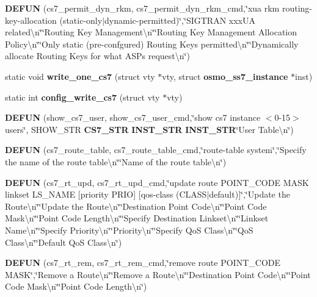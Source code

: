 \begin{DoxyCompactItemize}
\item 
{\bf D\+E\+F\+UN} (cs7\+\_\+permit\+\_\+dyn\+\_\+rkm, cs7\+\_\+permit\+\_\+dyn\+\_\+rkm\+\_\+cmd,\char`\"{}xua rkm routing-\/key-\/allocation (static-\/only$\vert$dynamic-\/permitted)\char`\"{},\char`\"{}S\+I\+G\+T\+R\+AN xxx\+UA related\textbackslash{}n\char`\"{}\char`\"{}Routing Key Management\textbackslash{}n\char`\"{}\char`\"{}Routing Key Management Allocation Policy\textbackslash{}n\char`\"{}\char`\"{}Only static (pre-\/confgured) Routing Keys permitted\textbackslash{}n\char`\"{}\char`\"{}Dynamically allocate Routing Keys for what A\+S\+Ps request\textbackslash{}n\char`\"{})
\item 
static void {\bf write\+\_\+one\+\_\+cs7} (struct vty $\ast$vty, struct {\bf osmo\+\_\+ss7\+\_\+instance} $\ast$inst)
\item 
static int {\bf config\+\_\+write\+\_\+cs7} (struct vty $\ast$vty)
\item 
{\bf D\+E\+F\+UN} (show\+\_\+cs7\+\_\+user, show\+\_\+cs7\+\_\+user\+\_\+cmd,\char`\"{}show cs7 instance $<$0-\/15$>$ users\char`\"{}, S\+H\+O\+W\+\_\+\+S\+TR {\bf C\+S7\+\_\+\+S\+TR} {\bf I\+N\+S\+T\+\_\+\+S\+TR} {\bf I\+N\+S\+T\+\_\+\+S\+TR}\char`\"{}User Table\textbackslash{}n\char`\"{})
\item 
{\bf D\+E\+F\+UN} (cs7\+\_\+route\+\_\+table, cs7\+\_\+route\+\_\+table\+\_\+cmd,\char`\"{}route-\/table system\char`\"{},\char`\"{}Specify the name of the route table\textbackslash{}n\char`\"{}\char`\"{}Name of the route table\textbackslash{}n\char`\"{})
\item 
{\bf D\+E\+F\+UN} (cs7\+\_\+rt\+\_\+upd, cs7\+\_\+rt\+\_\+upd\+\_\+cmd,\char`\"{}update route P\+O\+I\+N\+T\+\_\+\+C\+O\+DE M\+A\+SK linkset L\+S\+\_\+\+N\+A\+ME [priority P\+R\+IO] [qos-\/class (C\+L\+A\+SS$\vert$default)]\char`\"{},\char`\"{}Update the Route\textbackslash{}n\char`\"{}\char`\"{}Update the Route\textbackslash{}n\char`\"{}\char`\"{}Destination Point Code\textbackslash{}n\char`\"{}\char`\"{}Point Code Mask\textbackslash{}n\char`\"{}\char`\"{}Point Code Length\textbackslash{}n\char`\"{}\char`\"{}Specify Destination Linkset\textbackslash{}n\char`\"{}\char`\"{}Linkset Name\textbackslash{}n\char`\"{}\char`\"{}Specify Priority\textbackslash{}n\char`\"{}\char`\"{}Priority\textbackslash{}n\char`\"{}\char`\"{}Specify QoS Class\textbackslash{}n\char`\"{}\char`\"{}QoS Class\textbackslash{}n\char`\"{}\char`\"{}Default QoS Class\textbackslash{}n\char`\"{})
\item 
{\bf D\+E\+F\+UN} (cs7\+\_\+rt\+\_\+rem, cs7\+\_\+rt\+\_\+rem\+\_\+cmd,\char`\"{}remove route P\+O\+I\+N\+T\+\_\+\+C\+O\+DE M\+A\+SK\char`\"{},\char`\"{}Remove a Route\textbackslash{}n\char`\"{}\char`\"{}Remove a Route\textbackslash{}n\char`\"{}\char`\"{}Destination Point Code\textbackslash{}n\char`\"{}\char`\"{}Point Code Mask\textbackslash{}n\char`\"{}\char`\"{}Point Code Length\textbackslash{}n\char`\"{})

\end{DoxyCompactItemize}
